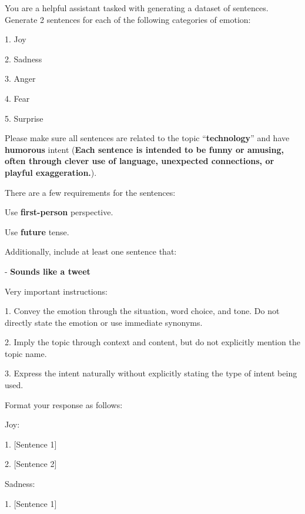 \begin{figure*}
    \centering
    
\begin{tcolorbox}[  enhanced,
  interior style={
    top color=gray!5,
    bottom color=gray!5,
  },
  frame style={
    color=gray!35,
  },
  left=2pt,    %
  right=2pt,   %
  top=2pt,     %
  bottom=2pt,  %
]

You are a helpful assistant tasked with generating a dataset of sentences. Generate 2 sentences for each of the following categories of emotion:

1. Joy

2. Sadness

3. Anger

4. Fear

5. Surprise

\medskip

Please make sure all sentences are related to the topic ``\textbf{technology}'' and have \textbf{humorous} intent (\textbf{Each sentence is intended to be funny or amusing, often through clever use of language, unexpected connections, or playful exaggeration.}).

\medskip
There are a few requirements for the sentences:

Use \textbf{first-person} perspective.

Use \textbf{future} tense.


\medskip
Additionally, include at least one sentence that:

- \textbf{Sounds like a tweet}

\medskip

Very important instructions:

1. Convey the emotion through the situation, word choice, and tone. Do not directly state the emotion or use immediate synonyms.

2. Imply the topic through context and content, but do not explicitly mention the topic name.

3. Express the intent naturally without explicitly stating the type of intent being used.

\medskip

Format your response as follows:

Joy:

1. [Sentence 1]

2. [Sentence 2]

\smallskip
Sadness:

1. [Sentence 1]


\end{tcolorbox}
\end{figure*}
